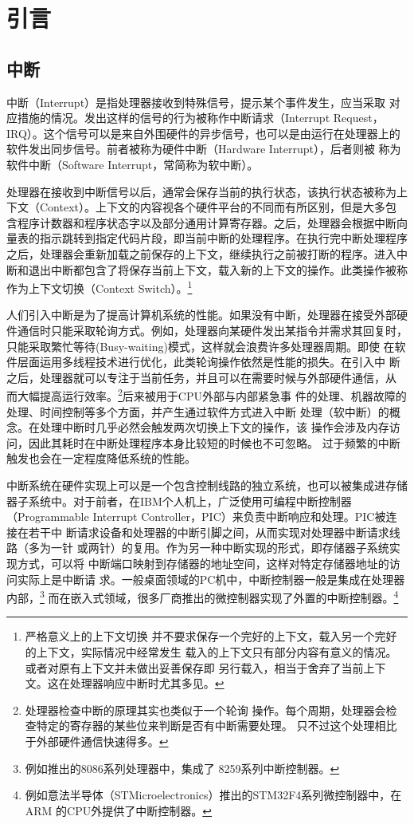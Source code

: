 
\chapter{引言}
\label{cha:intro}

\section{中断}
\label{sec:intr}
中断（Interrupt）是指处理器接收到特殊信号，提示某个事件发生，应当采取
对应措施的情况。发出这样的信号的行为被称作中断请求（Interrupt Request，
IRQ）。这个信号可以是来自外围硬件的异步信号，也可以是由运行在处理器上的
软件发出同步信号。前者被称为硬件中断（Hardware Interrupt），后者则被
称为软件中断（Software Interrupt，常简称为软中断）。

处理器在接收到中断信号以后，通常会保存当前的执行状态，该执行状态被称为上
下文（Context）。上下文的内容视各个硬件平台的不同而有所区别，但是大多包
含程序计数器和程序状态字以及部分通用计算寄存器。之后，处理器会根据中断向
量表的指示跳转到指定代码片段，即当前中断的处理程序。在执行完中断处理程序
之后，处理器会重新加载之前保存的上下文，继续执行之前被打断的程序。进入中
断和退出中断都包含了将保存当前上下文，载入新的上下文的操作。此类操作被称
作为上下文切换（Context Switch）。\footnote{严格意义上的上下文切换
并不要求保存一个完好的上下文，载入另一个完好的上下文，实际情况中经常发生
载入的上下文只有部分内容有意义的情况。或者对原有上下文并未做出妥善保存即
另行载入，相当于舍弃了当前上下文。这在处理器响应中断时尤其多见。}

人们引入中断是为了提高计算机系统的性能。如果没有中断，处理器在接受外部硬
件通信时只能采取轮询方式。例如，处理器向某硬件发出某指令并需求其回复时，
只能采取繁忙等待(Busy-waiting)模式，这样就会浪费许多处理器周期。即使
在软件层面运用多线程技术进行优化，此类轮询操作依然是性能的损失。在引入中
断之后，处理器就可以专注于当前任务，并且可以在需要时候与外部硬件通信，从
而大幅提高运行效率。\footnote{处理器检查中断的原理其实也类似于一个轮询
操作。每个周期，处理器会检查特定的寄存器的某些位来判断是否有中断需要处理。
只不过这个处理相比于外部硬件通信快速得多。}后来被用于CPU外部与内部紧急事
件的处理、机器故障的处理、时间控制等多个方面，并产生通过软件方式进入中断
处理（软中断）的概念。在处理中断时几乎必然会触发两次切换上下文的操作，该
操作会涉及内存访问，因此其耗时在中断处理程序本身比较短的时候也不可忽略。
过于频繁的中断触发也会在一定程度降低系统的性能。

中断系统在硬件实现上可以是一个包含控制线路的独立系统，也可以被集成进存储
器子系统中。对于前者，在IBM个人机上，广泛使用可编程中断控制器（Programmable 
Interrupt Controller，PIC）来负责中断响应和处理。PIC被连接在若干中
断请求设备和处理器的中断引脚之间，从而实现对处理器中断请求线路（多为一针
或两针）的复用。作为另一种中断实现的形式，即存储器子系统实现方式，可以将
中断端口映射到存储器的地址空间，这样对特定存储器地址的访问实际上是中断请
求。一般桌面领域的PC机中，中断控制器一般是集成在处理器内部，\footnote{
例如\intel{}推出的8086系列处理器中，集成了\intel{} 8259系列中断控制器。}
而在嵌入式领域，很多厂商推出的微控制器实现了外置的中断控制器。\footnote{
例如意法半导体（STMicroelectronics）推出的STM32F4系列微控制器中，在ARM
的CPU外提供了中断控制器。}

